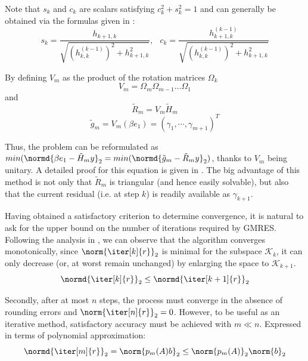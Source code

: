 \noindent Note that $s_k$ and $c_k$ are scalars satisfying $c^2_k+s^2_k=1$ and can generally be obtained via the formulas given in \cite{saad_iterative_2003}:
\begin{equation}
    s_k=\frac{h_{k+1, k}}{\sqrt{(h^{(k-1)}_{k,k})^2+h^2_{k+1, k}}}\text{,   } \;\;c_k=\frac{h^{(k-1)}_{k+1, k}}{\sqrt{(h^{(k-1)}_{k,k})^2+h^2_{k+1, k}}}
\end{equation}

\noindent By defining $V_m$ as the product of the rotation matrices $\Omega_k$
\begin{equation}
    V_m = \Omega_m \Omega_{m-1} \dots \Omega_1
\end{equation}
\noindent and
\begin{equation}
    \tilde{R}_m = V_m\tilde{H}_m 
\end{equation}
\begin{equation}
        \tilde{g}_m = V_m(\beta e_1) = (\gamma_1, \cdots, \gamma_{m+1})^T
\end{equation}

\noindent Thus, the problem can be reformulated as $min(\normd{\beta e_1 -\tilde{H}_my}_2=min(\normd{\tilde{g}_m -\tilde{R}_my}_2)$, thanks to $V_m$ being unitary. A detailed proof for this equation is given in \cite{saad_iterative_2003}. The big advantage of this method is not only that $\tilde{R}_m$ is triangular (and hence easily solvable), but also that the current residual (i.e. at step $k$) is readily available as $\gamma_{k+1}$.

Having obtained a satisfactory criterion to determine convergence, it is natural to ask for the upper bound on the number of iterations required by GMRES. Following the analysis in \cite{trefethen_numerical_1997}, we can observe that the algorithm converges monotonically, since $\norm{\iter[k]{r}}_2$ is minimal for the subspace $\mathcal{K}_k$, it can only decrease (or, at worst remain unchanged) by enlarging the space to $\mathcal{K}_{k+1}$.
\begin{equation}
    \normd{\iter[k]{r}}_2\leq \normd{\iter[k+1]{r}}_2
\end{equation}

\noindent Secondly, after at most $n$ steps, the process must converge in the absence of rounding errors and $\norm{\iter[n]{r}}_2 = 0$. However, to be useful as an iterative method, satisfactory accuracy must be achieved with  $m \ll n$. Expressed in terms of polynomial approximation: 
\begin{equation}
    \normd{\iter[m]{r}}_2=\norm{p_m(A)b}_2 \leq \norm{p_m(A)}_2\norm{b}_2
\end{equation}

